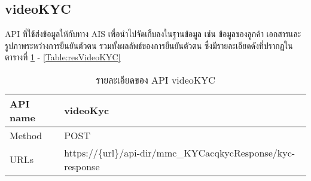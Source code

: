 \subsection{videoKYC}
	API ที่ใช้ส่งข้อมูลให้กับทาง AIS เพื่อนำไปจัดเก็บลงในฐานข้อมูล เช่น ข้อมูลของลูกค้า เอกสารและรูปภาพระหว่างการยืนยันตัวตน รวมทั้งผลลัพธ์ของการยืนยันตัวตน ซึ่งมีรายละเอียดดังที่ปรากฏในตารางที่ \ref{Table:specVideoKYC} - \ref{Table:resVideoKYC}
	\begin{table}[!htb]
		\centering
		\captionsetup{singlelinecheck = false, justification=justified}
		\caption{รายละเอียดของ API videoKYC}
		\label{Table:specVideoKYC}
		\begin{tabular}{|l|l|}
			\hline
			\rowcolor[HTML]{FFFFFF} 
			API name & videoKyc \\ \hline
			Method & POST \\ \hline
			URLs & https://\{url\}/api-dir/mmc\_KYCacqkycResponse/kyc-response \\ \hline
		\end{tabular}
	\end{table}
